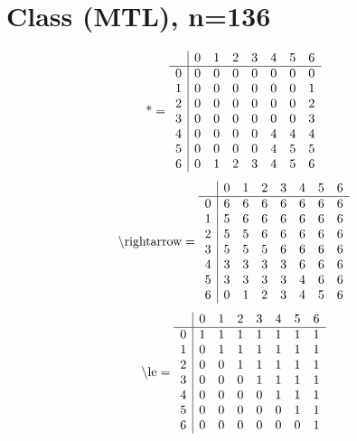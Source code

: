 \documentclass[11pt]{article}
\begin{document}
\section{Class (MTL), n=136}
\[\text{*} = 
\begin{array}{r | r r r r r r r}
 & 0 & 1 & 2 & 3 & 4 & 5 & 6 \\ \hline
0 & 0 & 0 & 0 & 0 & 0 & 0 & 0 \\
1 & 0 & 0 & 0 & 0 & 0 & 0 & 1 \\
2 & 0 & 0 & 0 & 0 & 0 & 0 & 2 \\
3 & 0 & 0 & 0 & 0 & 0 & 0 & 3 \\
4 & 0 & 0 & 0 & 0 & 4 & 4 & 4 \\
5 & 0 & 0 & 0 & 0 & 4 & 5 & 5 \\
6 & 0 & 1 & 2 & 3 & 4 & 5 & 6 \\
\end{array}
\]
\[\text{\textbackslash rightarrow} = 
\begin{array}{r | r r r r r r r}
 & 0 & 1 & 2 & 3 & 4 & 5 & 6 \\ \hline
0 & 6 & 6 & 6 & 6 & 6 & 6 & 6 \\
1 & 5 & 6 & 6 & 6 & 6 & 6 & 6 \\
2 & 5 & 5 & 6 & 6 & 6 & 6 & 6 \\
3 & 5 & 5 & 5 & 6 & 6 & 6 & 6 \\
4 & 3 & 3 & 3 & 3 & 6 & 6 & 6 \\
5 & 3 & 3 & 3 & 3 & 4 & 6 & 6 \\
6 & 0 & 1 & 2 & 3 & 4 & 5 & 6 \\
\end{array}
\]
\[\text{\textbackslash le} = 
\begin{array}{r | r r r r r r r}
 & 0 & 1 & 2 & 3 & 4 & 5 & 6 \\ \hline
0 & 1 & 1 & 1 & 1 & 1 & 1 & 1 \\
1 & 0 & 1 & 1 & 1 & 1 & 1 & 1 \\
2 & 0 & 0 & 1 & 1 & 1 & 1 & 1 \\
3 & 0 & 0 & 0 & 1 & 1 & 1 & 1 \\
4 & 0 & 0 & 0 & 0 & 1 & 1 & 1 \\
5 & 0 & 0 & 0 & 0 & 0 & 1 & 1 \\
6 & 0 & 0 & 0 & 0 & 0 & 0 & 1 \\
\end{array}
\]
\end{document}
